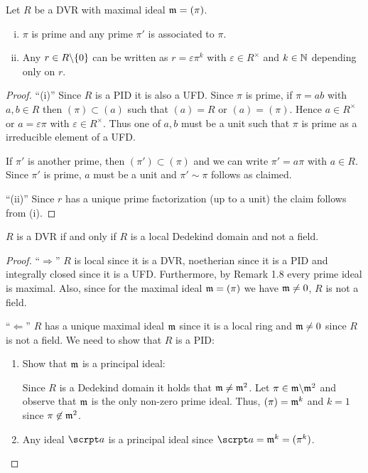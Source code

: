 
\begin{Bem}
Let $R$ be a DVR with maximal ideal $\mathfrak{m} = (\pi)$.
\begin{enumerate}[(i)]
	\item $\pi$ is prime and any prime $\pi'$ is associated to $\pi$.
	\item Any $r \in R \backslash \{0\}$ can be written as $r = \varepsilon \pi^k$ with $\varepsilon \in R^\times$ and $k \in\mathbb{N}$ depending only on $r$.
\end{enumerate}
\end{Bem}

\begin{proof}
\enquote{(i)}
Since $R$ is a PID it is also a UFD. Since $\pi$ is prime, if $\pi = ab$ with $a,b \in R$ then
$(\pi) \subset (a)$ such that $(a) = R$ or $(a) = (\pi)$. Hence $a \in R^\times$ or $a = \varepsilon \pi$ with $\varepsilon \in R^\times$. Thus one of $a, b$ must be a unit such that $\pi$ is prime as a irreducible element of a UFD.

\bigskip If $\pi'$ is another prime, then $(\pi') \subset (\pi)$ and we can write $\pi' = a \pi$ with $a \in R$. Since $\pi'$ is prime, $a$ must be a unit and $ \pi' \sim \pi$ follows as claimed.

\bigskip \enquote{(ii)} Since $r$ has a unique prime factorization (up to a unit) the claim follows from (i).
\end{proof}

\begin{Prop}
$R$ is a DVR if and only if $R$ is a local Dedekind domain and not a field.
\end{Prop}

\begin{proof}
\enquote{$\Rightarrow$} $R$ is local since it is a DVR, noetherian since it is a PID and integrally closed since it is a UFD. Furthermore, by Remark 1.8 every prime ideal is maximal. Also, since for the maximal ideal $\mathfrak{m} = (\pi)$ we have $\mathfrak{m} \neq 0$, $R$ is not a field.

\bigskip \enquote{$\Leftarrow$} $R$ has a unique maximal ideal $\mathfrak{m}$ since it is a local ring and $\mathfrak{m} \neq 0$ since $R$ is not a field. We need to show that $R$ is a PID:
\begin{enumerate}[(1)]
	\item Show that $\mathfrak{m}$ is a principal ideal:
	
			Since $R$ is a Dedekind domain it holds that $\mathfrak{m} \neq \mathfrak{m}^2$. Let $\pi \in \mathfrak{m} \backslash \mathfrak{m}^2$ and observe that $\mathfrak{m}$ is the only non-zero prime ideal.
			Thus, $(\pi) = \mathfrak{m}^k$ and $k=1$ since $\pi \not \in \mathfrak{m}^2$.
	\item Any ideal $\a$ is a principal ideal since $\a = \m^k = (\pi^k)$.
\end{enumerate}
\end{proof}

